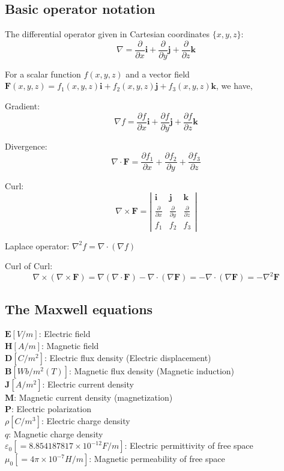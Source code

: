 \subsection{Basic operator notation}

The differential operator given in Cartesian coordinates $\{x,y,z\}$: $$\nabla = \frac{\partial}{\partial x}\mathbf{i} + \frac{\partial}{\partial y}\mathbf{j} + \frac{\partial}{\partial z}\mathbf{k}$$

For a scalar function $f(x,y,z)$ and a vector field $\mathbf{F}(x,y,z) = f_1(x,y,z)\mathbf{i} + f_2(x,y,z)\mathbf{j} + f_3(x,y,z)\mathbf{k}$, we have,

Gradient: $$\nabla f = \frac{\partial f}{\partial x}\mathbf{i} + \frac{\partial f}{\partial y}\mathbf{j} + \frac{\partial f}{\partial z}\mathbf{k}$$

Divergence: $$\nabla\cdot\mathbf{F} = \frac{\partial f_1}{\partial x} + \frac{\partial f_2}{\partial y} + \frac{\partial f_3}{\partial z}$$

Curl: $$\nabla\times\mathbf{F} = \left|
    \begin{array}{ccc}
      \mathbf{i} & \mathbf{j} & \mathbf{k} \\
      \frac{\partial}{\partial x} & \frac{\partial}{\partial y} & \frac{\partial}{\partial z} \\
      f_1 & f_2 & f_3
    \end{array}
  \right|$$

Laplace operator: $\nabla^2 f = \nabla\cdot(\nabla f)$

Curl of Curl: 
\begin{equation}
    \nabla\times(\nabla\times\mathbf{F}) = \nabla(\nabla\cdot\mathbf{F}) - \nabla\cdot(\nabla\mathbf{F}) = - \nabla\cdot(\nabla\mathbf{F}) = -\nabla^2\mathbf{F} \label{CurlOfCurl}
\end{equation}


\subsection{The Maxwell equations}

$\mathbf{E} [V/m]$: Electric field \\
$\mathbf{H} [A/m]$: Magnetic field \\
$\mathbf{D} [C/m^2]$: Electric flux density (Electric displacement) \\
$\mathbf{B} [Wb/m^2(T)]$: Magnetic flux density (Magnetic induction) \\
$\mathbf{J} [A/m^2]$: Electric current density \\
$\mathbf{M}$: Magnetic current density (magnetization)\\
$\mathbf{P}$: Electric polarization \\
$\rho [C/m^3]$: Electric charge density \\
$q$: Magnetic charge density \\
$\varepsilon_0 [=8.854187817\times10^{-12}F/m]$: Electric permittivity of free space \\
$\mu_0 [=4\pi\times10^{-7}H/m]$: Magnetic permeability of free space \\

